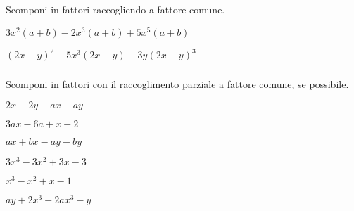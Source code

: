 \begin{esercizio}[*]
Scomponi in fattori raccogliendo a fattore comune.
\label{ese:div.012}
\begin{enumeratea}
\item \(3x^{2}(a+b)-2x^{3}(a+b)+5x^{5}(a+b)\)
\item \((2x-y)^{2}-5x^{3}(2x-y)-3y(2x-y)^{3}\)
\end{enumeratea}
\end{esercizio}

\subsubsection*{}

\begin{esercizio}[*]
\label{ese:div.013}
Scomponi in fattori con il raccoglimento parziale a fattore comune, se 
possibile.
\begin{htmulticols}{2}
\begin{enumeratea}
\item \(2x-2y+ax-ay\) 
\item \(3ax-6a+x-2\) 
\item \(ax+bx-ay-by\) 
\item \(3x^{3}-3x^{2}+3x-3\) 
\item \(x^{3}-x^{2}+x-1\) 
\item \(ay+2x^{3}-2ax^{3}-y\) 
\end{enumeratea}
\end{htmulticols}
\end{esercizio}

